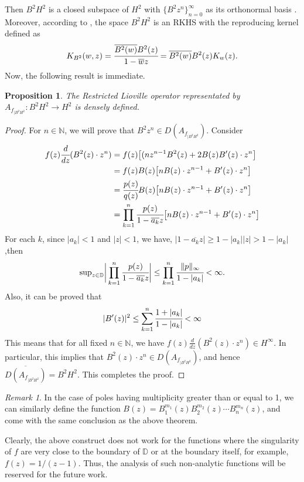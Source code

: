 \documentclass[preprint,12pt]{elsarticle} %
\theoremstyle{plain}
\newtheorem{proposition}[theorem]{Proposition}
\theoremstyle{definition}
\theoremstyle{remark}
\newtheorem{remark}[theorem]{Remark}
\begin{document}
 Then $B^2 H^2$ is a closed subspace of $H^2$ with $\{B^2 z^n\}_{n=0}^{\infty}$ as its orthonormal basis \cite{lata2022multivariable}. Moreover, according to \cite{garcia2018finite}, the space $B^2H^2$ is an RKHS with the reproducing kernel defined as
 \[
 K_{B^2}(w,z)=\cfrac{\overline{B^2(w)}B^2(z)}{1-\overline{w}z}=\overline{B^2(w)}B^2(z)K_w(z).
 \]
 Now, the following result is immediate.

\begin{proposition}
    The Restricted Lioville operator representated by $A_{f_{|B^2 H^2}}: B^2H^2\rightarrow H^2$ is densely defined.
\end{proposition}
\begin{proof}
    For $n\in \mathbb{N}$, we will prove that $B^2 z^n\in D(A_{f_{|B^2 H^2}})$. Consider
    \begin{align*}
   f(z) \cfrac{d}{dz}(B^2(z)\cdot z^n) &= f(z)\big[(nz^{n-1}B^2(z) + 2B(z)B'(z)\cdot z^n\big]\\  
    & = f(z)B(z)\big[nB(z)\cdot z^{n-1}+B'(z)\cdot z^n\big]\\
    &= \cfrac{p(z)}{q(z)}B(z)\big[nB(z)\cdot z^{n-1}+B'(z)\cdot z^n\big]\\
    &= \prod_{k=1}^{n}\cfrac{p(z)}{1-\overline{a_k}z}\big[nB(z)\cdot z^{n-1}+B'(z)\cdot z^n\big]  
    \end{align*}
For each $k$, since $|a_k|<1$ and $|z|<1$, we have,
$
|1-\overline{a_k}z|\geq 1-|a_k||z|> 1-|a_k|
$
,then $$\text{sup}_{z\in \mathbb{D}}\bigg| \prod_{k=1}^{n}\cfrac{p(z)}{1-\overline{a_k}z}\bigg|\leq \prod_{k=1}^{n}\cfrac{\|p\|_{\infty}}{1-|a_k|}<\infty.$$ 
Also, it can be proved that $$|B'(z)|^2\leq\sum_{k=1}^{n}\cfrac{1+|a_k|}{1-|a_k|}<\infty$$
This means that for all fixed $n\in \mathbb{N}$, we have $f(z) \frac{d}{dz}(B^2(z)\cdot z^n)\in H^{\infty}$. In particular, this implies that $B^2(z)\cdot z^n\in D(A_{f_{|B^2 H^2}})$, and hence $\overline{D(A_{f_{|B^2 H^2}})}=B^2H^2$. This completes the proof. 
\end{proof}

\begin{remark}
   In the case of poles having multiplicity greater than or equal to 1, we can similarly define the function $B(z)=B_1^{m_1}(z)B_2^{m_2}(z)\cdots B_n^{m_n}(z)$, and come with the same conclusion as the above theorem. 
\end{remark}
 Clearly, the above construct does not work for the functions where the singularity of $f$ are very close to the boundary of $\mathbb{D}$ or at the boundary itself, for example, $f(z)=1/(z-1)$. Thus, the analysis of such non-analytic functions will be reserved for the future work.
\end{document}
